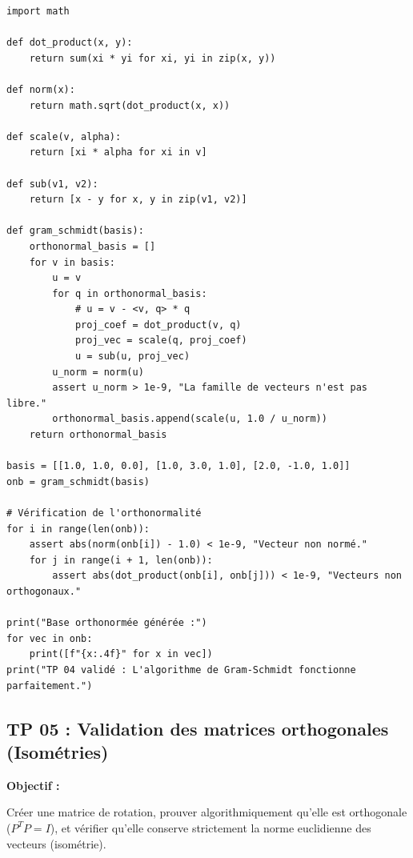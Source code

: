 \documentclass[11pt,a4paper]{article}
\begin{document}
\begin{lstlisting}
import math

def dot_product(x, y):
    return sum(xi * yi for xi, yi in zip(x, y))

def norm(x):
    return math.sqrt(dot_product(x, x))

def scale(v, alpha):
    return [xi * alpha for xi in v]

def sub(v1, v2):
    return [x - y for x, y in zip(v1, v2)]

def gram_schmidt(basis):
    orthonormal_basis = []
    for v in basis:
        u = v
        for q in orthonormal_basis:
            # u = v - <v, q> * q
            proj_coef = dot_product(v, q)
            proj_vec = scale(q, proj_coef)
            u = sub(u, proj_vec)
        u_norm = norm(u)
        assert u_norm > 1e-9, "La famille de vecteurs n'est pas libre."
        orthonormal_basis.append(scale(u, 1.0 / u_norm))
    return orthonormal_basis

basis = [[1.0, 1.0, 0.0], [1.0, 3.0, 1.0], [2.0, -1.0, 1.0]]
onb = gram_schmidt(basis)

# Vérification de l'orthonormalité
for i in range(len(onb)):
    assert abs(norm(onb[i]) - 1.0) < 1e-9, "Vecteur non normé."
    for j in range(i + 1, len(onb)):
        assert abs(dot_product(onb[i], onb[j])) < 1e-9, "Vecteurs non orthogonaux."

print("Base orthonormée générée :")
for vec in onb:
    print([f"{x:.4f}" for x in vec])
print("TP 04 validé : L'algorithme de Gram-Schmidt fonctionne parfaitement.")
\end{lstlisting}

\subsection*{TP 05 : Validation des matrices orthogonales (Isométries)}

\textbf{Objectif :}

Créer une matrice de rotation, prouver algorithmiquement qu'elle est orthogonale ($P^T P = I$), et vérifier qu'elle conserve strictement la norme euclidienne des vecteurs (isométrie).
\end{document}
